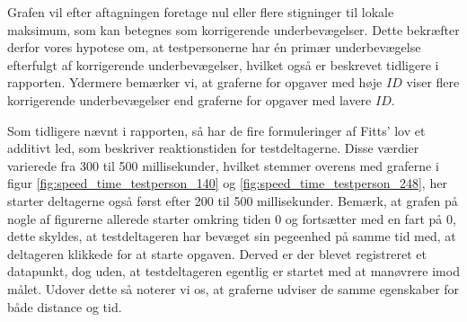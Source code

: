 Grafen vil efter aftagningen foretage nul eller flere stigninger til lokale maksimum, som kan betegnes som korrigerende underbevægelser. Dette bekræfter derfor vores hypotese om, at testpersonerne har én primær underbevægelse efterfulgt af korrigerende underbevægelser, hvilket også er beskrevet tidligere i rapporten. Ydermere bemærker vi, at graferne for opgaver med høje $ID$ viser flere korrigerende underbevægelser end graferne for opgaver med lavere $ID$.

Som tidligere nævnt i rapporten, så har de fire formuleringer af Fitts' lov et additivt led, som beskriver reaktionstiden for testdeltagerne. Disse værdier varierede fra 300 til 500 millisekunder, hvilket stemmer overens med graferne i figur \ref{fig:speed_time_testperson_140} og \ref{fig:speed_time_testperson_248}, her starter deltagerne også først efter 200 til 500 millisekunder. Bemærk, at grafen på nogle af figurerne allerede starter omkring tiden 0 og fortsætter med en fart på 0, dette skyldes, at testdeltageren har bevæget sin pegeenhed på samme tid med, at deltageren klikkede for at starte opgaven. Derved er der blevet registreret et datapunkt, dog uden, at testdeltageren egentlig er startet med at manøvrere imod målet. Udover dette så noterer vi os, at graferne udviser de samme egenskaber for både distance og tid.

